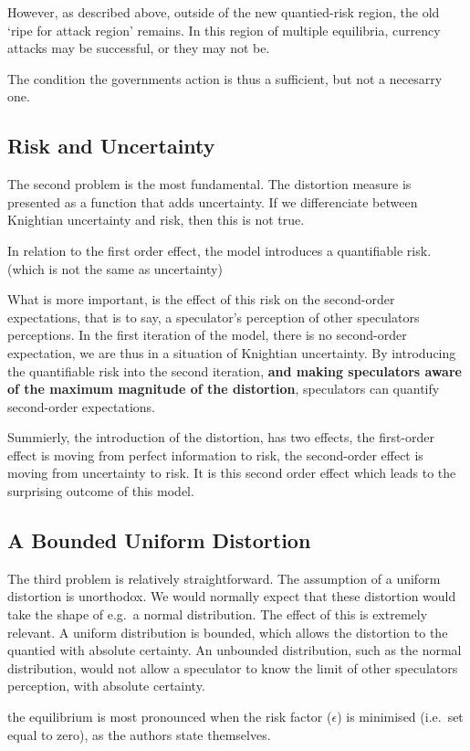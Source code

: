 \begin{refsection}
However, as described above, outside of the new quantied-risk region, the old `ripe for attack region' remains.
In this region of multiple equilibria, currency attacks may be successful, or they may not be.

The condition the governments action is thus a sufficient, but not a necesarry one.


\subsection{Risk and Uncertainty}
The second problem is the most fundamental. The distortion measure is presented as a function that adds uncertainty.
If we differenciate between Knightian uncertainty and risk, then this is not true.

In relation to the first order effect,
the model introduces a quantifiable risk. (which is not the same as uncertainty)

What is more important, is the effect of this risk on the second-order expectations,
that is to say, a speculator's perception of other speculators perceptions.
In the first iteration of the model, there is no second-order expectation,
we are thus in a situation of Knightian uncertainty.
By introducing the quantifiable risk into the second iteration,
\textbf{and making speculators aware of the maximum magnitude of the distortion},
speculators can quantify second-order expectations.

Summierly, the introduction of the distortion, has two effects,
the first-order effect is moving from perfect information to risk,
the second-order effect is moving from uncertainty to risk.
It is this second order effect which leads to the surprising outcome of this model.

\subsection{A Bounded Uniform Distortion}
The third problem is relatively straightforward.
The assumption of a uniform distortion is unorthodox.
We would normally expect that these distortion would take the shape of e.g.~a normal distribution.
The effect of this is extremely relevant.
A uniform distribution is bounded,
which allows the distortion to the quantied with absolute certainty.
An unbounded distribution, such as the normal distribution,
would not allow a speculator to know the limit of other speculators perception,
with absolute certainty.

the equilibrium is most pronounced when the risk factor ($\epsilon$) is minimised (i.e.~set equal to zero),
as the authors state themselves. %


\end{refsection}
